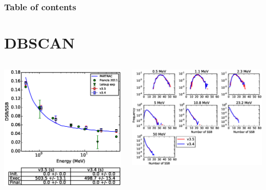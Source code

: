\documentclass[aspectratio=1610]{beamer}
\title{\SUTname}
\subtitle{Regression testing (cf.\ \benchmarkname)}
\author{Jos\'e Ramos-M\'endez}
\institute{University of California San Francisco}
\date{\today}
\begin{document}
\frame{\titlepage}

\begin{frame}
  \frametitle{Table of contents}
  \tableofcontents
\end{frame}




\section{DBSCAN}

\begin{frame}{\secname}
 \begin{columns}
  \begin{column}{0.4\linewidth}
   \includegraphics[width=1.1\textwidth]{DBSCAN2}
  \end{column}
  \begin{column}{0.6\linewidth} 
   \includegraphics[width=\textwidth]{DBSCAN1}

\end{column}
\end{columns}
\end{frame}
\end{document}
